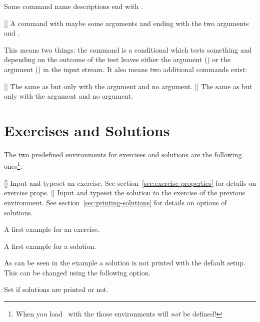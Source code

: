 \documentclass{xsim-manual}
\begin{document}
Some command name descriptions end with \code{\TF}.
\begin{commands}
  []
    A command with maybe some arguments and ending with the two arguments
     and .
\end{commands}
This means two things: the command is a conditional which tests something and
depending on the outcome of the test leaves either the  argument
() or the  argument () in the input stream.  It
also means two additional commands exist:
\begin{commands}
  []
    The same as  but only with the  argument and
    no  argument.
  []
    The same as  but only with the  argument and
    no  argument.
\end{commands}

\section{Exercises and Solutions}

The two predefined environments for exercises and solutions are the following
ones\footnote{When you load \xsim\ with the  those environments
  will \emph{not} be defined!}:
\begin{environments}
  []
    Input and typeset an exercise.  See section~\vref{sec:exercise-properties}
    for details on exercise \acsp*{prop}.
  []
    Input and typeset the solution to the exercise of the previous
     environment.  See section~\vref{sec:printing-solutions} for
    details on options of solutions.
\end{environments}

\begin{example}
  \begin{exercise}
    A first example for an exercise.
  \end{exercise}
  \begin{solution}
    A first example for a solution.
  \end{solution}
\end{example}

As can be seen in the example a solution is not printed with the default
setup.  This can be changed using the following option.
\begin{options}
    Set if solutions are printed or not.
\end{options}
\end{document}
